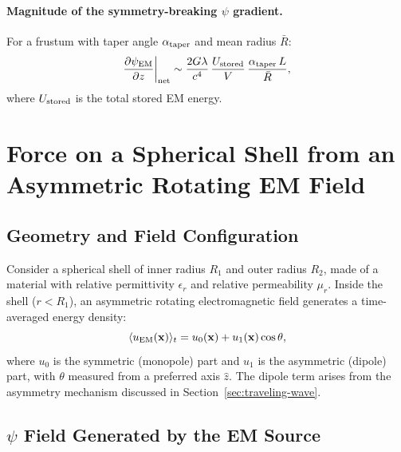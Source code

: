 \documentclass[aps,prd,twocolumn,superscriptaddress,floatfix,nofootinbib]{revtex4-2}
\newcommand{\lam}{\lambda}
\begin{document}
\paragraph{Magnitude of the symmetry-breaking $\psi$ gradient.}
For a frustum with taper angle $\alpha_{\rm taper}$ and mean
radius $\bar{R}$:
\begin{equation}
\frac{\partial\psi_{\rm EM}}{\partial z}\bigg|_{\rm net}
\sim \frac{2G\lam}{c^4}\,\frac{U_{\rm stored}}{V}
\,\frac{\alpha_{\rm taper}\,L}{\bar{R}},
\label{eq:psi-gradient-net}
\end{equation}
where $U_{\rm stored}$ is the total stored EM energy.


\section{Force on a Spherical Shell from an Asymmetric
Rotating EM Field}\label{sec:shell-force}

\subsection{Geometry and Field Configuration}
\label{sec:shell-geometry}

Consider a spherical shell of inner radius $R_1$ and outer radius $R_2$,
made of a material with relative permittivity $\epsilon_r$ and relative
permeability $\mu_r$. Inside the shell ($r < R_1$), an asymmetric
rotating electromagnetic field generates a time-averaged energy density:
\begin{equation}
\langle u_{\rm EM}(\mathbf{x})\rangle_t = u_0(\mathbf{x})
+ u_1(\mathbf{x})\cos\theta,
\end{equation}
where $u_0$ is the symmetric (monopole) part and $u_1$ is the
asymmetric (dipole) part, with $\theta$ measured from a preferred
axis $\hat{z}$. The dipole term arises from the asymmetry mechanism
discussed in Section~\ref{sec:traveling-wave}.

\subsection{$\psi$ Field Generated by the EM Source}
\label{sec:shell-psi}
\end{document}
